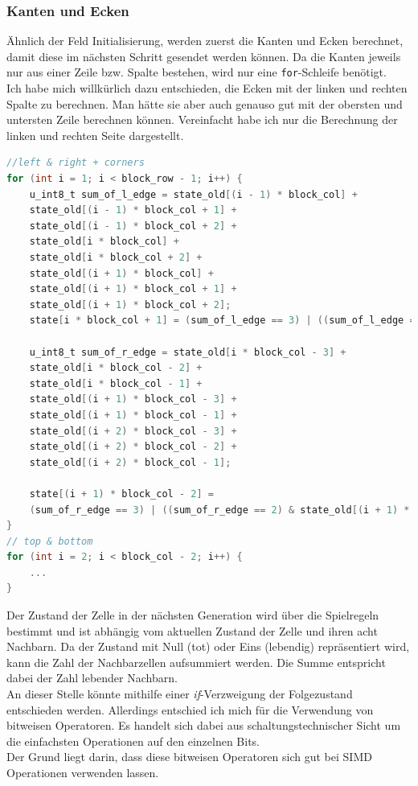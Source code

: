 \documentclass[german,plainarticle,hyperref,utf8]{zihpub}
\begin{document}
	\subsubsection{Kanten und Ecken} \label{Kanten}
	Ähnlich der Feld Initialisierung, werden zuerst die Kanten und Ecken berechnet, damit diese im nächsten Schritt gesendet werden können. Da die Kanten jeweils nur aus einer Zeile bzw. Spalte bestehen, wird nur eine \texttt{for}-Schleife benötigt.\\
	Ich habe mich willkürlich dazu entschieden, die Ecken mit der linken und rechten Spalte zu berechnen. Man hätte sie aber auch genauso gut mit der obersten und untersten Zeile berechnen können. Vereinfacht habe ich nur die Berechnung der linken und rechten Seite dargestellt.
	\begin{lstlisting}[language=C, caption=Berechnung der Kanten und Ecken]
//left & right + corners
for (int i = 1; i < block_row - 1; i++) {
	u_int8_t sum_of_l_edge = state_old[(i - 1) * block_col] +
	state_old[(i - 1) * block_col + 1] +
	state_old[(i - 1) * block_col + 2] +
	state_old[i * block_col] +
	state_old[i * block_col + 2] +
	state_old[(i + 1) * block_col] +
	state_old[(i + 1) * block_col + 1] +
	state_old[(i + 1) * block_col + 2];
	state[i * block_col + 1] = (sum_of_l_edge == 3) | ((sum_of_l_edge == 2) & state_old[i * block_col + 1]);
	
	u_int8_t sum_of_r_edge = state_old[i * block_col - 3] +
	state_old[i * block_col - 2] +
	state_old[i * block_col - 1] +
	state_old[(i + 1) * block_col - 3] +
	state_old[(i + 1) * block_col - 1] +
	state_old[(i + 2) * block_col - 3] +
	state_old[(i + 2) * block_col - 2] +
	state_old[(i + 2) * block_col - 1];
	
	state[(i + 1) * block_col - 2] =
	(sum_of_r_edge == 3) | ((sum_of_r_edge == 2) & state_old[(i + 1) * block_col - 2]);
}
// top & bottom
for (int i = 2; i < block_col - 2; i++) {
	...
}\end{lstlisting}
	Der Zustand der Zelle in der nächsten Generation wird über die Spielregeln bestimmt und ist abhängig vom aktuellen Zustand der Zelle und ihren acht Nachbarn. Da der Zustand mit Null (tot) oder Eins (lebendig) repräsentiert wird, kann die Zahl der Nachbarzellen aufsummiert werden. Die Summe entspricht dabei der Zahl lebender Nachbarn.\\
	An dieser Stelle könnte mithilfe einer \textit{if}-Verzweigung der Folgezustand entschieden werden. Allerdings entschied ich mich für die Verwendung von bitweisen Operatoren. Es handelt sich dabei aus schaltungstechnischer Sicht um die einfachsten Operationen auf den einzelnen Bits.\\
	Der Grund liegt darin, dass diese bitweisen Operatoren sich gut bei SIMD Operationen verwenden lassen.\\
	
\end{document}
